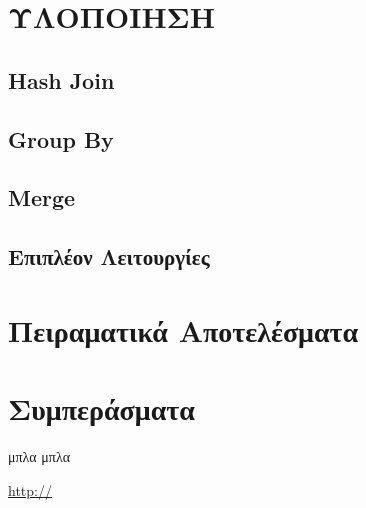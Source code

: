 \documentclass{article}
\newcommand{\en}[1]{\foreignlanguage{english}{#1}}
\begin{document}
\section{ΥΛΟΠΟΙΗΣΗ} \label{sec:Impl}

\subsection{\en{Hash Join}} \label{subsec:HJ}

\subsection{\en{Group By}} \label{subsec:GB}

\subsection{\en{Merge}} \label{subsec:MG}

\subsection{Επιπλέον Λειτουργίες} \label{subsec:Extras}

\section{Πειραματικά Αποτελέσματα} \label{sec:ExpRes}

\section{Συμπεράσματα} \label{sec:Eval}

μπλα μπλα

	\begin{thebibliography}{9}
		 \foreignlanguage{english}{\url{http://}}

	\end{thebibliography}
\end{document}
